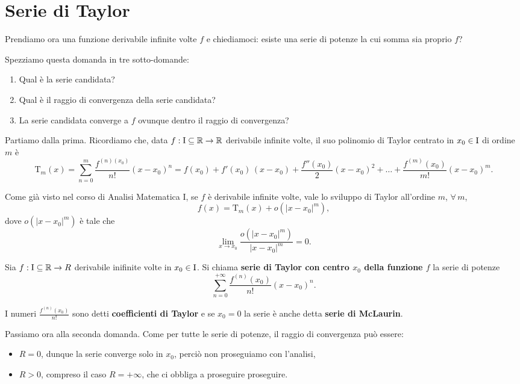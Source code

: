 \documentclass[../../analisi2]{subfiles}
\begin{document}
    \chapter{Serie di Taylor}

        Prendiamo ora una funzione derivabile infinite volte \(f\) e chiediamoci: esiste una serie di potenze la cui somma
        sia proprio \(f\)?

        Spezziamo questa domanda in tre sotto-domande:
        \begin{enumerate}
            \item Qual è la serie candidata?
            \item Qual è il raggio di convergenza della serie candidata?
            \item La serie candidata converge a \(f\) ovunque dentro il raggio di convergenza?
        \end{enumerate}

        Partiamo dalla prima. Ricordiamo che, data \(f : \mathrm{I} \subseteq \mathbb{R} \to \mathbb{R}\) derivabile infinite volte, il suo
        polinomio di Taylor centrato in \(x_0 \in \mathrm{I}\) di ordine \(m\) è
        \[
            \mathrm{T}_m (x) = \sum_{n = 0}^{m} \frac{f^{(n) (x_0)}}{n!} (x - x_0)^n = f(x_0) + f'(x_0) \, (x - x_0) + \frac{f''(x_0)}{2} (x - x_0)^2 + \ldots + \frac{f^{(m)} (x_0)}{m!} (x - x_0)^m.
        \]
        
        Come già visto nel corso di Analisi Matematica I, se \(f\) è derivabile infinite volte, vale lo sviluppo di Taylor
        all'ordine \(m\), \(\forall \, m\),
        \[
            f(x) = \mathrm{T}_m (x) + o(|x - x_0|^m),
        \]
        dove \(o(|x - x_0|^m)\) è tale che
        \[
            \lim_{x \to x_0} \frac{o(|x - x_0|^m)}{|x - x_0|^m} = 0.
        \]

        \begin{definizione}
            Sia \(f : \mathrm{I} \subseteq \mathbb{R} \to R\) derivabile inifinite volte in \(x_0 \in \mathrm{I}\). Si chiama
            \textbf{serie di Taylor con centro \(x_0\) della funzione \(f\)} la serie di potenze
            \[
                \sum_{n = 0}^{+\infty} \frac{f^{(n)} (x_0)}{n!} (x - x_0)^n.
            \]

            I numeri \(\frac{f^{(n)} (x_0)}{n!}\) sono detti \textbf{coefficienti di Taylor} e se \(x_0 = 0\) la serie è anche
            detta \textbf{serie di McLaurin}.
        \end{definizione}

        Passiamo ora alla seconda domanda. Come per tutte le serie di potenze, il raggio di convergenza può essere:
        \begin{itemize}
            \item \(R = 0\), dunque la serie converge solo in \(x_0\), perciò non proseguiamo con l'analisi,
            \item \(R > 0\), compreso il caso \(R = +\infty\), che ci obbliga a proseguire proseguire.
        \end{itemize}
\end{document}
